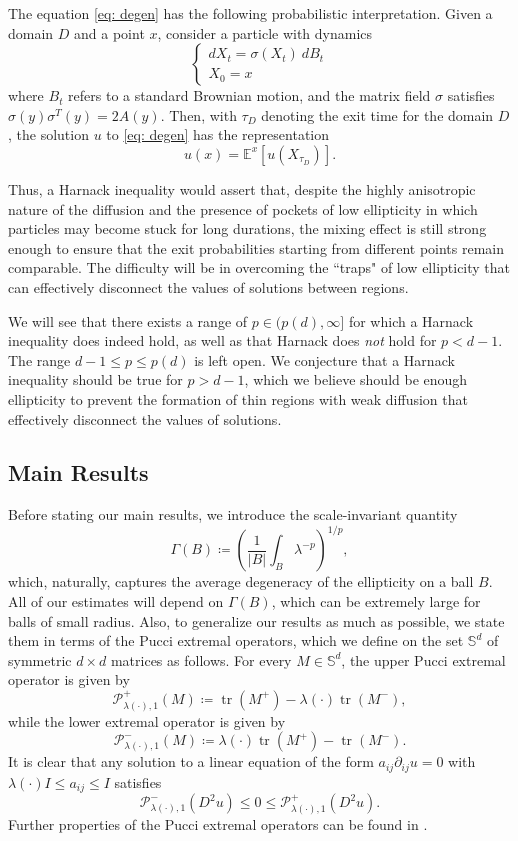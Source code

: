 \documentclass[reqno]{amsart}
\numberwithin{equation}{section}
\numberwithin{equation}{section}
\DeclareMathOperator{\tr}{tr}
\newcounter{case}
\begin{document}
The equation \eqref{eq: degen} has the following probabilistic interpretation. Given a domain $D$ and a point $x$, consider a particle with dynamics 
$$
\begin{cases}
    dX_t = \sigma(X_t) \ dB_t\\
    X_0 = x
\end{cases}
$$
where $B_t$ refers to a standard Brownian motion, and the matrix field $\sigma$ satisfies $\sigma(y) \sigma^T(y) = 2A(y)$. Then, with $\tau_D$ denoting the exit time for the domain $D$, the solution $u$ to \eqref{eq: degen} has the representation
$$u(x) = \mathbb{E}^x[u(X_{\tau_D})].$$

Thus, a Harnack inequality would assert that, despite the highly anisotropic nature of the diffusion and the presence of pockets of low ellipticity in which particles may become stuck for long durations, the mixing effect is still strong enough to ensure that the exit probabilities starting from different points remain comparable. The difficulty will be in overcoming the ``traps" of low ellipticity that can effectively disconnect the values of solutions between regions. 

We will see that there exists a range of $p\in (p(d), \infty]$ for which a Harnack inequality does indeed hold, as well as that Harnack does \textit{not} hold for $p<d-1$. The range $d-1 \le p \le p(d)$ is left open. We conjecture that a Harnack inequality should be true for $p>d-1$, which we believe should be enough ellipticity to prevent the formation of thin regions with weak diffusion that effectively disconnect the values of solutions.

\subsection{Main Results}
Before stating our main results, we introduce the scale-invariant quantity 
$$\Gamma(B) \coloneqq \left(\frac{1}{|B|}\int_B \lambda^{-p}\right)^{1/p},$$
which, naturally, captures the average degeneracy of the ellipticity on a ball $B$. All of our estimates will depend on $\Gamma(B)$, which can be extremely large for balls of small radius. Also, to generalize our results as much as possible, we state them in terms of the Pucci extremal operators, which we define on the set $\mathbb{S}^d$ of symmetric $d\times d$ matrices as follows. For every $M \in \mathbb{S}^d$, the upper Pucci extremal operator is given by 
$$\mathcal{P}^+_{\lambda(\cdot),1}(M) \coloneqq \tr(M^+) - \lambda(\cdot)\tr(M^-),$$
while the lower extremal operator is given by 
$$\mathcal{P}^-_{\lambda(\cdot),1}(M) \coloneqq \lambda(\cdot) \tr(M^+) - \tr(M^-).$$
It is clear that any solution to a linear equation of the form $a_{ij}\partial_{ij} u=0$ with $\lambda(\cdot) I \le a_{ij}\le I$ satisfies 
$$\mathcal{P}^-_{\lambda(\cdot), 1}(D^2u)\le 0 \le \mathcal{P}^+_{\lambda(\cdot),1}(D^2u).$$
Further properties of the Pucci extremal operators can be found in \cite{CaffarelliCabre1995}. 
\end{document}
